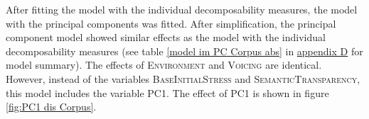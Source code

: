     \begin{table}[H]
    	\caption{ Summary of linear model for variables predicting the relative  duration of [s] in prefixed words with voiceless /s/}
    	\label{tbl: summary model7}
    	\begin{center}
    	\end{center}
    \end{table}



After fitting the model with the individual decomposability measures, the model with the principal components was fitted. After simplification, the principal component model showed similar effects as the model with the individual decomposability measures (see table \ref{model im PC Corpus abs} in \hyperref[Appendix D: model summaries corpus]{appendix D} for model summary). The effects of \textsc{Environment} and \textsc{Voicing} are identical. However, instead of the variables \textsc{BaseInitialStress} and \textsc{SemanticTransparency}, this model includes the variable \textsc{PC1}. 
The effect of \textsc{PC1} is shown in figure \ref{fig:PC1 dis Corpus}. 


